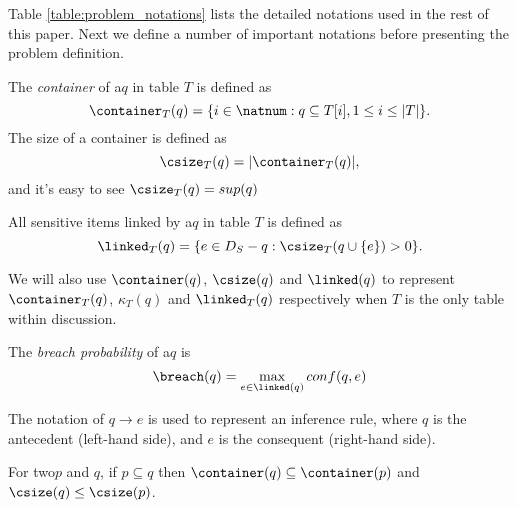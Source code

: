 
Table \ref{table:problem_notations} lists the detailed notations used in the
rest of this paper. Next we define a number of important notations before
presenting the problem definition.

\begin{definition}[Container]
The \emph{container} of a\qid $q$ in table $T$ is defined as \[
\container_T(q) = \{ i \in \natnum : q \subseteq T[i], 1 \leq i \leq |T| \}
.\] The size of a container is defined as \[ \csize_T(q) = |\container_T(q)|
,\] and it's easy to see $\csize_T(q) = sup(q)$
\end{definition}

\begin{definition}
All sensitive items linked by a\qid $q$ in table $T$ is defined as \[ \linked_T(q) = \{ e \in D_S-q : \csize_T(q\cup\{e\}) > 0 \} .\]
\end{definition}

We will also use $\container(q)$, $\csize(q)$ and $\linked(q)$ to represent $\container_T(q)$,
$\kappa_T(q)$ and $\linked_T(q)$ respectively when $T$ is the only table within discussion.

\begin{definition}
\label{def:probability} The \emph{breach probability} of a\qid $q$ is \[
\breach(q) = \max_{e\in\linked(q)} conf(q,e) \] 
\end{definition}

The notation of $q\rightarrow e$ is used to represent an inference rule,
  where $q$ is the antecedent (left-hand side), and $e$ is the consequent (right-hand side).

\begin{property}
\label{prop:container_size}
For two\qids $p$ and $q$, if $p\subseteq q$ then $\container(q)\subseteq\container(p)$ and $\csize(q)\leq \csize(p)$.
\end{property}

